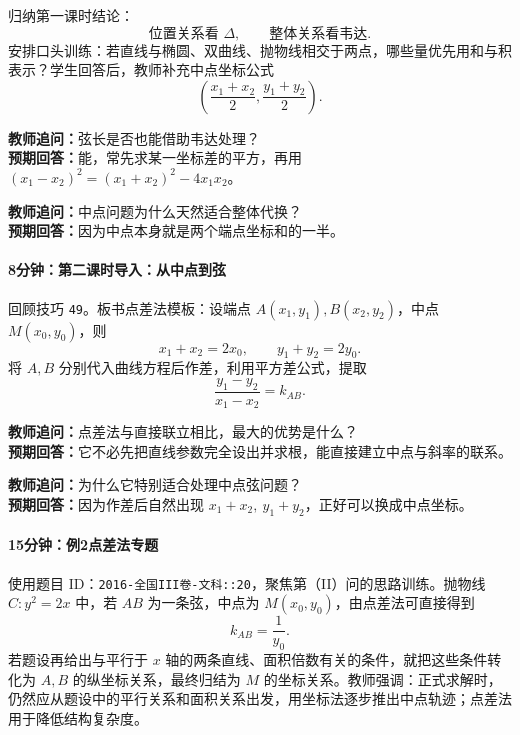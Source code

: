 \documentclass[UTF8,a4paper,11pt]{ctexart}
\begin{document}
归纳第一课时结论：\[\text{位置关系看 }\Delta,\qquad \text{整体关系看韦达}.\] 安排口头训练：若直线与椭圆、双曲线、抛物线相交于两点，哪些量优先用和与积表示？学生回答后，教师补充中点坐标公式\[\left(\frac{x_1+x_2}{2},\frac{y_1+y_2}{2}\right).\]

\noindent\textbf{教师追问：}弦长是否也能借助韦达处理？\\

\textbf{预期回答：}能，常先求某一坐标差的平方，再用 $(x_1-x_2)^2=(x_1+x_2)^2-4x_1x_2$。\par

\noindent\textbf{教师追问：}中点问题为什么天然适合整体代换？\\

\textbf{预期回答：}因为中点本身就是两个端点坐标和的一半。\par

\paragraph{8分钟：第二课时导入：从中点到弦}

回顾技巧 \texttt{49}。板书点差法模板：设端点 $A(x_1,y_1),B(x_2,y_2)$，中点 $M(x_0,y_0)$，则\[x_1+x_2=2x_0,\qquad y_1+y_2=2y_0.\] 将 $A,B$ 分别代入曲线方程后作差，利用平方差公式，提取\[\frac{y_1-y_2}{x_1-x_2}=k_{AB}.\]

\noindent\textbf{教师追问：}点差法与直接联立相比，最大的优势是什么？\\

\textbf{预期回答：}它不必先把直线参数完全设出并求根，能直接建立中点与斜率的联系。\par

\noindent\textbf{教师追问：}为什么它特别适合处理中点弦问题？\\

\textbf{预期回答：}因为作差后自然出现 $x_1+x_2,\ y_1+y_2$，正好可以换成中点坐标。\par

\paragraph{15分钟：例2点差法专题}

使用题目 ID：\texttt{2016-全国III卷-文科::20}，聚焦第（II）问的思路训练。抛物线 $C:y^2=2x$ 中，若 $AB$ 为一条弦，中点为 $M(x_0,y_0)$，由点差法可直接得到\[k_{AB}=\frac{1}{y_0}.\] 若题设再给出与平行于 $x$ 轴的两条直线、面积倍数有关的条件，就把这些条件转化为 $A,B$ 的纵坐标关系，最终归结为 $M$ 的坐标关系。教师强调：正式求解时，仍然应从题设中的平行关系和面积关系出发，用坐标法逐步推出中点轨迹；点差法用于降低结构复杂度。
\end{document}

